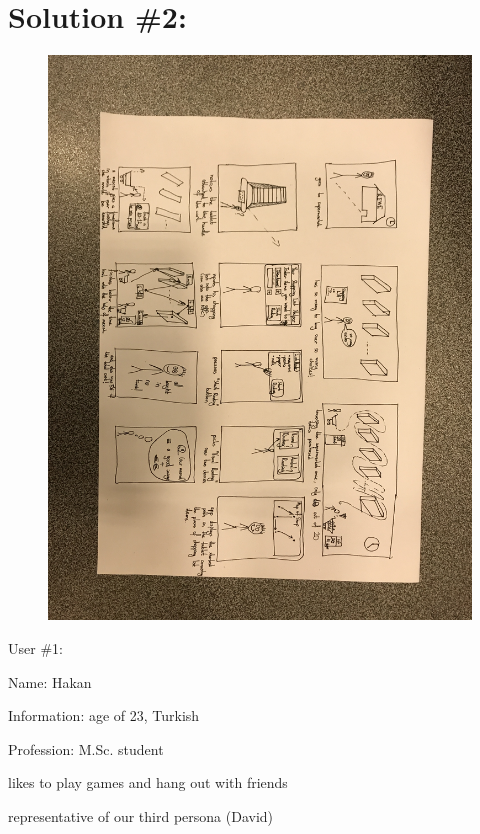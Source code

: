 \documentclass[a4paper,10pt,oneside]{scrreprt}
\begin{document}
\section{Solution \#2:}
\begin{figure}[h]
	\centering
	\includegraphics[scale=0.16, clip, trim={71em 35em 33em 43em}]{images/s2.jpg}
\end{figure}

User \#1:
\begin{compactitem}
	\item Name: Hakan
	\item Information: age of 23, Turkish
	\item Profession: M.Sc. student
	\item likes to  play games and hang out with friends
	\item representative of our third persona (David)
\end{compactitem}
\bigskip
\end{document}
